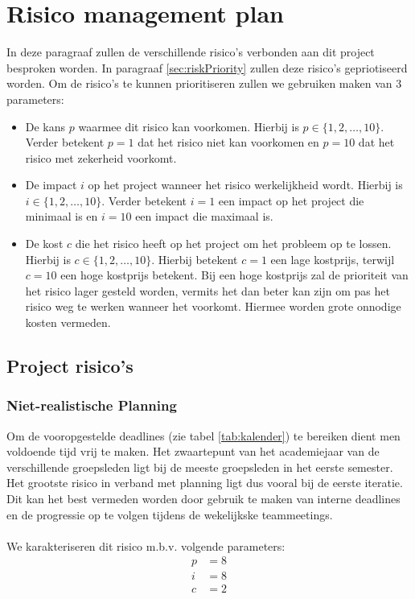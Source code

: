 \section{Risico management plan} \label{sec:risicoManagementPlan}
In deze paragraaf zullen de verschillende risico's verbonden aan dit project besproken worden. In paragraaf \ref{sec:riskPriority} zullen deze risico's gepriotiseerd worden. Om de risico's te kunnen prioritiseren zullen we gebruiken maken van 3 parameters:
\begin{itemize}
	\item 
		De kans $p$ waarmee dit risico kan voorkomen. Hierbij is $ p \in \{1, 2, \ldots , 10\} $. Verder betekent $p = 1$ dat het risico niet kan voorkomen en $p = 10$ dat het risico met zekerheid voorkomt.
	\item 
		De impact $i$ op het project wanneer het risico werkelijkheid wordt. Hierbij is $ i \in \{1, 2, \ldots , 10\} $. Verder betekent $i = 1$ een impact op het project die minimaal is en $i = 10$ een impact die maximaal is.
	\item 
		De kost $c$ die het risico heeft op het project om het probleem op te lossen. Hierbij is $ c \in \{1, 2, \ldots , 10\} $. Hierbij betekent $c = 1$ een lage kostprijs, terwijl $c=10$ een hoge kostprijs betekent. Bij een hoge kostprijs zal de prioriteit van het risico lager gesteld worden, vermits het dan beter kan zijn om pas het risico weg te werken wanneer het voorkomt. Hiermee worden grote onnodige kosten vermeden.
		
\end{itemize}
\subsection{Project risico's}
\subsubsection{Niet-realistische Planning}
Om de vooropgestelde deadlines (zie tabel \ref{tab:kalender}) te bereiken dient men voldoende tijd vrij te maken. Het zwaartepunt van het academiejaar van de verschillende groepsleden ligt bij de meeste groepsleden in het eerste semester. Het grootste risico in verband met planning ligt dus vooral bij de eerste iteratie. Dit kan het best vermeden worden door gebruik te maken van interne deadlines en de progressie op te volgen tijdens de wekelijkske teammeetings.
\\
\\
We karakteriseren dit risico m.b.v. volgende parameters:
\begin{align*}
	p &= 8\\
	i &= 8\\
	c &= 2
\end{align*}

